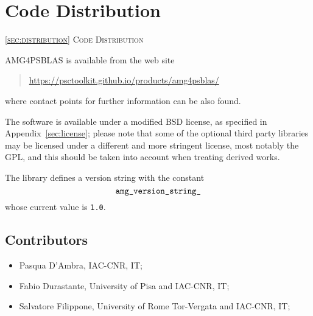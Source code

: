 \section{Code Distribution\label{sec:distribution}}
         {\textsc{\ref{sec:distribution} Code Distribution}}

\noindent
AMG4PSBLAS is available from the web site
\begin{quotation}
\href{https://psctoolkit.github.io/products/amg4psblas/}{https://psctoolkit.github.io/products/amg4psblas/}
\end{quotation}
where contact points for further information can be also found.

The software is available under a modified BSD license, as specified
in Appendix~\ref{sec:license}; please note that some of the optional
third party libraries may be licensed under a different and more
stringent license, most notably the GPL, and this should be taken into
account when treating derived works.

The library defines a version string with the
constant
\[ \verb|amg_version_string_|\]
whose current value is \verb|1.0|.

\subsection*{Contributors}
\begin{itemize}
\item Pasqua D'Ambra, IAC-CNR, IT;			
\item Fabio Durastante, University of Pisa and IAC-CNR, IT;
\item Salvatore  Filippone, University of Rome Tor-Vergata and IAC-CNR, IT;				
\end{itemize}